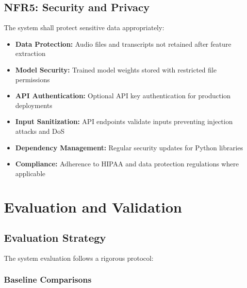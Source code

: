 \documentclass[12pt]{article}
\begin{document}
	\subsection{NFR5: Security and Privacy}

	The system shall protect sensitive data appropriately:

	\begin{itemize}
		\item \textbf{Data Protection:} Audio files and transcripts not retained after feature extraction
		\item \textbf{Model Security:} Trained model weights stored with restricted file permissions
		\item \textbf{API Authentication:} Optional API key authentication for production deployments
		\item \textbf{Input Sanitization:} API endpoints validate inputs preventing injection attacks and DoS
		\item \textbf{Dependency Management:} Regular security updates for Python libraries
		\item \textbf{Compliance:} Adherence to HIPAA and data protection regulations where applicable
	\end{itemize}


	\section{Evaluation and Validation}

	\subsection{Evaluation Strategy}

	The system evaluation follows a rigorous protocol:

	\subsubsection{Baseline Comparisons}
\end{document}

